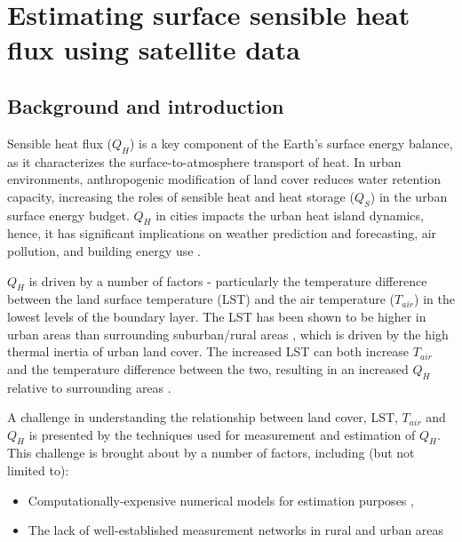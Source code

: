 \chapter{Estimating surface sensible heat flux using satellite data}
\label{chapter:goes}
\thispagestyle{myheadings}

\graphicspath{{2_Pub1/}}

\section{Background and introduction}

Sensible heat flux ($Q_H$) is a key component of the Earth's surface energy balance, as it characterizes the surface-to-atmosphere transport of heat. In urban environments,  anthropogenic modification of land cover reduces water retention capacity, increasing the roles of sensible heat and heat storage ($Q_S$) in the urban surface energy budget.  $Q_H$ in cities impacts the urban heat island dynamics, hence, it has significant implications on weather prediction and forecasting, air pollution, and building energy use \citep{Imran_2018, Schumacher_2019, Vautard_2007}. 

$Q_H$ is driven by a number of factors - particularly the temperature difference between the land surface temperature (LST) and the air temperature ($T_{air}$) in the lowest levels of the boundary layer. The LST has been shown to be higher in urban areas than surrounding suburban/rural areas \citep{Price_1979}, which is driven by the high thermal inertia of urban land cover. The increased LST can both increase $T_{air}$ and the temperature difference between the two, resulting in an increased $Q_H$ relative to surrounding areas \citep{Kato_2005}.

A challenge in understanding the relationship between land cover, LST, $T_{air}$ and $Q_H$ is presented by the techniques used for measurement and estimation of $Q_H$. This challenge is brought about by a number of factors, including (but not limited to):

\begin{itemize}
    \item Computationally-expensive numerical models for estimation purposes \citep{Best_2005, Zhang_2015},
    \item The lack of well-established measurement networks in rural and urban areas \citep{chrysoulakis_urban_2018, Voogt_2003}
\end{itemize}

